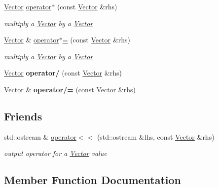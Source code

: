 \begin{DoxyCompactItemize}
\hyperlink{class_vector}{Vector} \hyperlink{class_vector_a75b5542c03e632c0878344b848484e7f}{operator$\ast$} (const \hyperlink{class_vector}{Vector} \&rhs)
\begin{DoxyCompactList}\small\item\em multiply a \hyperlink{class_vector}{Vector} by a \hyperlink{class_vector}{Vector} \end{DoxyCompactList}\item 
\hyperlink{class_vector}{Vector} \& \hyperlink{class_vector_ad11d9fcd63d0e55f92e0bdd75962ef93}{operator$\ast$=} (const \hyperlink{class_vector}{Vector} \&rhs)
\begin{DoxyCompactList}\small\item\em multiply a \hyperlink{class_vector}{Vector} by a \hyperlink{class_vector}{Vector} \end{DoxyCompactList}\item 
\hyperlink{class_vector}{Vector} {\bfseries operator/} (const \hyperlink{class_vector}{Vector} \&rhs)\hypertarget{class_vector_a724979bc434a348f33b46ff2276d4a8e}{}\label{class_vector_a724979bc434a348f33b46ff2276d4a8e}

\item 
\hyperlink{class_vector}{Vector} \& {\bfseries operator/=} (const \hyperlink{class_vector}{Vector} \&rhs)\hypertarget{class_vector_a0b07c786333df9dae5006001aba5f47b}{}\label{class_vector_a0b07c786333df9dae5006001aba5f47b}

\end{DoxyCompactItemize}
\subsection*{Friends}
\begin{DoxyCompactItemize}
\item 
std\+::ostream \& \hyperlink{class_vector_a1a6a2cfdcb4d9ef4755c9576be8947ba}{operator$<$$<$} (std\+::ostream \&lhs, const \hyperlink{class_vector}{Vector} \&rhs)
\begin{DoxyCompactList}\small\item\em output operator for a \hyperlink{class_vector}{Vector} value \end{DoxyCompactList}\end{DoxyCompactItemize}


\subsection{Member Function Documentation}
